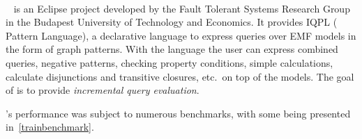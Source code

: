 \paragraph{\eiq{}} \eiq{}~\cite{icmt2011} is an Eclipse project developed by the Fault Tolerant Systems Research Group in the Budapest University of Technology and Economics. It provides IQPL (\iq{} Pattern Language), a declarative language to express queries over EMF models in the form of graph patterns. With the language the user can express combined queries, negative patterns, checking property conditions, simple calculations, calculate disjunctions and transitive closures, etc.\ on top of the models. The goal of \eiq{} is to provide \emph{incremental query evaluation}.

\eiq{}'s performance was subject to numerous benchmarks, with some being presented in~\autoref{trainbenchmark}. 

